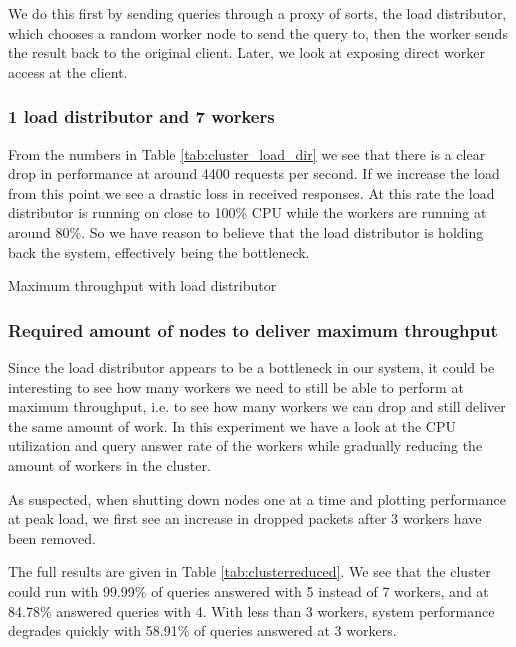 We do this first by sending queries through a proxy of sorts, the load distributor, which chooses a random worker node to send the query to, then the worker sends the result back to the original client.
Later, we look at exposing direct worker access at the client.

\subsubsection{1 load distributor and 7 workers}
From the numbers in Table \ref{tab:cluster_load_dir} we see that there is a clear drop in performance at around 4400 requests per second. If we increase the load from this point we see a drastic loss in received responses. At this rate the load distributor is running on close to 100\% CPU while the workers are running at around 80\%. So we have reason to believe that the load distributor is holding back the system, effectively being the bottleneck.

\clusterloaddir
\begin{table}[h]
	\centering
	\pgfplotstabletypeset[
     	columns={requests, received},
     	every head row/.style={before row=\hline,
     	after row=\hline},
		every last row/.style={after row=\hline},
		columns/requests/.style={column name=Requests per second},
		columns/received/.style={column name=\% queries served},
     	]
    {\clusterloaddir}
	\caption{Maximum throughput with load distributor}
	\label{tab:cluster_load_dir}
\end{table}

\subsubsection{Required amount of nodes to deliver maximum throughput}
Since the load distributor appears to be a bottleneck in our system, it could be interesting to see how many workers we need to still be able to perform at maximum throughput, i.e. to see how many workers we can drop and still deliver the same amount of work.
In this experiment we have a look at the CPU utilization and query answer rate of the workers while gradually reducing the amount of workers in the cluster.

As suspected, when shutting down nodes one at a time and plotting performance at peak load, we first see an increase in dropped packets after 3 workers have been removed.

The full results are given in Table \ref{tab:clusterreduced}. We see that the cluster could run with 99.99\% of queries answered with 5 instead of 7 workers, and at 84.78\% answered queries with 4. With less than 3 workers, system performance degrades quickly with 58.91\% of queries answered at 3 workers.

